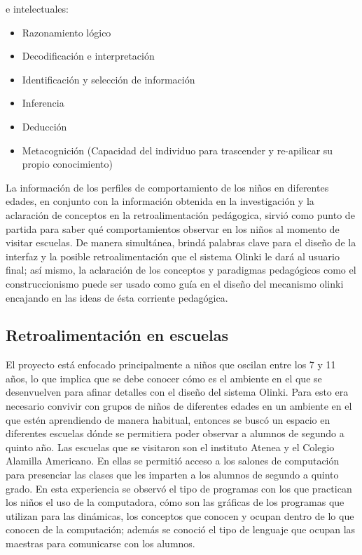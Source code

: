 \documentclass[letterpaper,10pt]{article}
\begin{document}
e intelectuales:
\begin{itemize}
	\item Razonamiento lógico
	\item Decodificación e interpretación
	\item Identificación y selección de información
	\item Inferencia
	\item Deducción
	\item Metacognición (Capacidad del individuo para trascender y re-apilicar su propio conocimiento)
\end{itemize}

La información de los perfiles de comportamiento de los niños en diferentes edades, 
en conjunto con la información obtenida en la investigación y la aclaración de 
conceptos en la retroalimentación pedágogica, sirvió como punto de partida para saber 
qué comportamientos observar en los niños al momento de visitar escuelas. 
De manera simultánea, brindá palabras clave para el diseño de la interfaz y la 
posible retroalimentación que el sistema Olinki le dará al usuario final; 
así mismo, la aclaración de los conceptos y paradigmas pedagógicos como el
construccionismo puede ser usado como guía en el diseño del mecanismo olinki 
encajando en las ideas de ésta corriente pedagógica.

\subsection{Retroalimentación en escuelas}

El proyecto está enfocado principalmente a niños que oscilan entre los 7 y 11 años, 
lo que implica que se debe conocer cómo es el ambiente en el que se desenvuelven 
para afinar detalles con el diseño del sistema Olinki. 
Para esto era necesario convivir con grupos de niños de diferentes edades en un 
ambiente en el que estén aprendiendo de manera habitual, 
entonces se buscó un espacio en diferentes escuelas dónde se permitiera poder
observar a alumnos de segundo a quinto año.
\newline
Las escuelas que se visitaron son el instituto Atenea y el Colegio Alamilla Americano. 
En ellas se  permitió acceso a los salones de computación para presenciar las 
clases que les imparten a los alumnos de segundo a quinto grado. 
En esta experiencia se observó el tipo de programas con los que practican los niños 
el uso de la computadora, cómo son las gráficas de los programas que utilizan para 
las dinámicas, los conceptos que conocen y ocupan dentro de lo que conocen de la 
computación; además se conoció el tipo de lenguaje que ocupan las maestras para
comunicarse con los alumnos.
\end{document}
